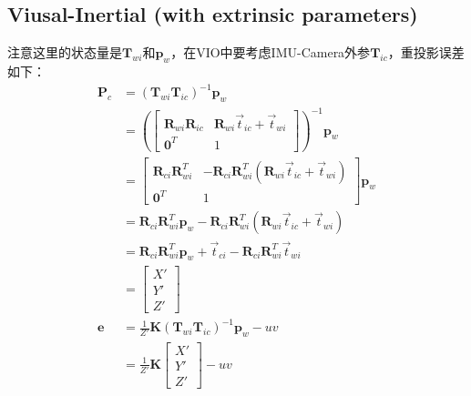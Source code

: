 \documentclass{article}
\begin{document}
\subsection{Viusal-Inertial (with extrinsic parameters)}
注意这里的状态量是$\boldsymbol{T}_{wi}$和$\boldsymbol{p}_w$，在VIO中要考虑IMU-Camera外参$\boldsymbol{T}_{ic}$，重投影误差如下：
\begin{equation}
	\begin{aligned}
		\boldsymbol{P}_c                         & =(\boldsymbol{T}_{wi}\boldsymbol{T}_{ic})^{-1}\boldsymbol{p}_w                                 \\&=
		\left(
		\left[
		\begin{matrix}
		\boldsymbol{R}_{wi}\boldsymbol{R}_{ic}   & \boldsymbol{R}_{wi}\vec{t}_{ic}+\vec{t}_{wi}                                                   \\
		\boldsymbol{0}^T                         & 1                                                                                              
		\end{matrix}
		\right]
		\right)^{-1}\boldsymbol{p}_w \\&=                              
		\left[
		\begin{matrix}
		\boldsymbol{R}_{ci}\boldsymbol{R}_{wi}^T & -\boldsymbol{R}_{ci}\boldsymbol{R}_{wi}^T(\boldsymbol{R}_{wi}\vec{t}_{ic}+\vec{t}_{wi})        \\
		\boldsymbol{0}^T                         & 1                                                                                              
		\end{matrix}
		\right]\boldsymbol{p}_w \\&=
		\boldsymbol{R}_{ci}\boldsymbol{R}_{wi}^T\boldsymbol{p}_w  -\boldsymbol{R}_{ci}\boldsymbol{R}_{wi}^T(\boldsymbol{R}_{wi}\vec{t}_{ic}+\vec{t}_{wi}) \\&=
		\boldsymbol{R}_{ci}\boldsymbol{R}_{wi}^T\boldsymbol{p}_w  +\vec{t}_{ci}-\boldsymbol{R}_{ci}\boldsymbol{R}_{wi}^T\vec{t}_{wi} \\&=
		\left[
		\begin{matrix}
		X'\\
		Y'\\                                         
		Z' 
		\end{matrix}
		\right] \\
		\boldsymbol {e}                          & =\frac{1}{Z'}\boldsymbol{K} (\boldsymbol{T}_{wi}\boldsymbol{T}_{ic})^{-1}\boldsymbol{p}_w  -uv \\&=
		\frac{1}{Z'}\boldsymbol{K} 
		\left[
		\begin{matrix}
		X'\\
		Y'\\                                         
		Z'
		\end{matrix}
		\right]-uv
	\end{aligned}
	\label{equation:reprj_err}
\end{equation}
\end{document}
